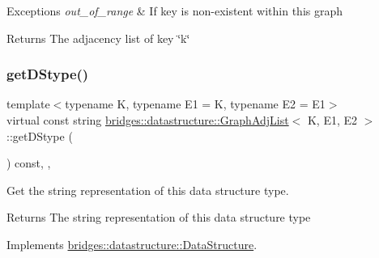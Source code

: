 \begin{DoxyExceptions}{Exceptions}
{\em out\+\_\+of\+\_\+range} & If key is non-\/existent within this graph\\
\hline
\end{DoxyExceptions}
\begin{DoxyReturn}{Returns}
The adjacency list of key \char`\"{}k\char`\"{} 
\end{DoxyReturn}
\mbox{\label{classbridges_1_1datastructure_1_1_graph_adj_list_adf1bfde5ec7192f3ee334695059f8fa6}} 
\subsubsection{\texorpdfstring{get\+D\+Stype()}{getDStype()}}
{\footnotesize\ttfamily template$<$typename K, typename E1 = K, typename E2 = E1$>$ \\
virtual const string \hyperlink{classbridges_1_1datastructure_1_1_graph_adj_list}{bridges\+::datastructure\+::\+Graph\+Adj\+List}$<$ K, E1, E2 $>$\+::get\+D\+Stype (\begin{DoxyParamCaption}{ }\end{DoxyParamCaption}) const\hspace{0.3cm}{\ttfamily [inline]}, {\ttfamily [override]}, {\ttfamily [virtual]}}



Get the string representation of this data structure type. 

\begin{DoxyReturn}{Returns}
The string representation of this data structure type 
\end{DoxyReturn}


Implements \hyperlink{classbridges_1_1datastructure_1_1_data_structure_a4ff66cb34409f11fe9fc647f6d8a22ce}{bridges\+::datastructure\+::\+Data\+Structure}.

\mbox{\label{classbridges_1_1datastructure_1_1_graph_adj_list_a2d8ff5a971516d05ff07bb1c3b73e405}} 
